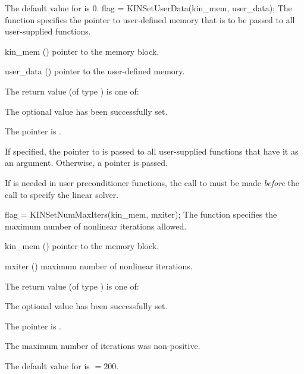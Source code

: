 {
  The default value for  is $0$.
}
{
flag = KINSetUserData(kin\_mem, user\_data);
}
{
  The function  specifies the pointer to user-defined memory
  that is to be passed to all user-supplied functions.
}
{
  \begin{args}
  \item[kin\_mem] ()
    pointer to the {\kinsol} memory block.
  \item[user\_data] ()
    pointer to the user-defined memory.
  \end{args}
}
{
  The return value  (of type ) is one of:
  \begin{args}
  \item[\Id{KIN\_SUCCESS}] 
    The optional value has been successfully set.
  \item[\Id{KIN\_MEM\_NULL}]
    The  pointer is .
  \end{args}
}
{
  If specified, the pointer to  is passed to all user-supplied 
  functions that have it as an argument. Otherwise, a  pointer is passed.

  {\warn}If  is needed in user preconditioner functions, the call to
   must be made {\it before} the call to specify the
  linear solver.
}
{
flag = KINSetNumMaxIters(kin\_mem, mxiter);
}
{
  The function  specifies the maximum number of 
  nonlinear iterations allowed.
}
{
  \begin{args}
  \item[kin\_mem] ()
    pointer to the {\kinsol} memory block.
  \item[mxiter] ()
    maximum number of nonlinear iterations.
  \end{args}
}
{
  The return value  (of type ) is one of:
  \begin{args}
  \item[\Id{KIN\_SUCCESS}] 
    The optional value has been successfully set.
  \item[\Id{KIN\_MEM\_NULL}]
    The  pointer is .
  \item[\Id{KIN\_ILL\_INPUT}]
    The maximum number of iterations was non-positive.
  \end{args}
}
{
  The default value for  is  $=200$.
}
